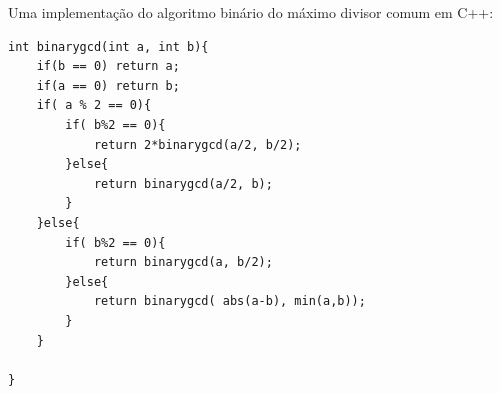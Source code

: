 Uma implementação do algoritmo binário do máximo divisor comum em C++:
\begin{verbatim}
int binarygcd(int a, int b){
    if(b == 0) return a;
    if(a == 0) return b;
    if( a % 2 == 0){
        if( b%2 == 0){
            return 2*binarygcd(a/2, b/2);
        }else{
            return binarygcd(a/2, b);
        }
    }else{
        if( b%2 == 0){
            return binarygcd(a, b/2);
        }else{
            return binarygcd( abs(a-b), min(a,b));
        }
    }

}
\end{verbatim}



